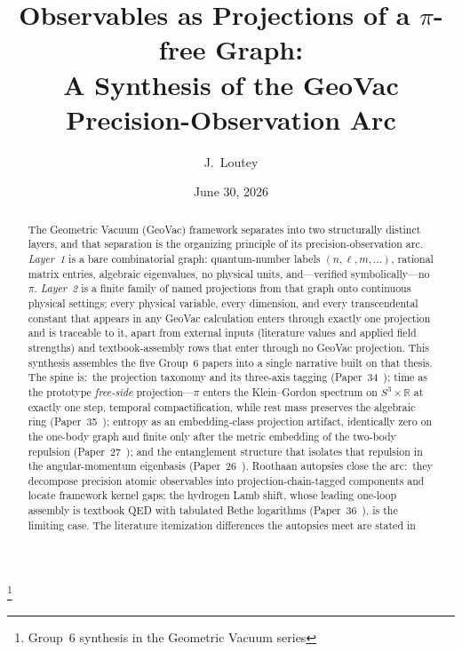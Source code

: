 \documentclass[aps,pra,twocolumn,superscriptaddress,longbibliography,nofootinbib]{revtex4-2}
\begin{document}
\title{Observables as Projections of a $\pi$-free Graph:\\
A Synthesis of the GeoVac Precision-Observation Arc}
\thanks{Group~6 synthesis in the Geometric Vacuum series}

\author{J.~Loutey}

\date{June 30, 2026}


\begin{abstract}
The Geometric Vacuum (GeoVac) framework separates into two structurally
distinct layers, and that separation is the organizing principle of its
precision-observation arc.  \emph{Layer~1} is a bare combinatorial graph:
quantum-number labels $(n,\ell,m,\ldots)$, rational matrix entries,
algebraic eigenvalues, no physical units, and---verified
symbolically---no $\pi$.  \emph{Layer~2} is a finite family of named
projections from that graph onto continuous physical settings; every
physical variable, every dimension, and every transcendental constant
that appears in any GeoVac calculation enters through exactly one
projection and is traceable to it, apart from external inputs (literature
values and applied field strengths) and textbook-assembly rows that
enter through no GeoVac projection.  This synthesis assembles the five
Group~6 papers into a single narrative built on that thesis.  The spine
is:\ the projection taxonomy and its three-axis tagging
(Paper~34~\cite{loutey_paper34}); time as the prototype \emph{free-side}
projection---$\pi$ enters the Klein--Gordon spectrum on
$S^3\times\mathbb{R}$ at exactly one step, temporal compactification,
while rest mass preserves the algebraic ring
(Paper~35~\cite{loutey_paper35}); entropy as an embedding-class
projection artifact, identically zero on the one-body graph and finite
only after the metric embedding of the two-body repulsion
(Paper~27~\cite{loutey_paper27}); and the entanglement structure that
isolates that repulsion in the angular-momentum eigenbasis
(Paper~26~\cite{loutey_paper26}).  Roothaan autopsies close the arc:\
they decompose precision atomic observables into projection-chain-tagged
components and locate framework kernel gaps; the hydrogen Lamb shift,
whose leading one-loop assembly is textbook QED with tabulated Bethe
logarithms (Paper~36~\cite{loutey_paper36}), is the limiting case.  The
literature itemization differences the autopsies meet are stated in

\end{abstract}
\end{document}
